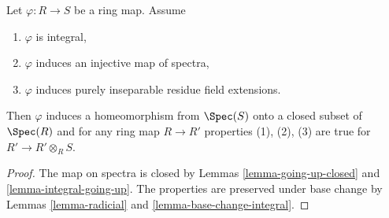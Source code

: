 \begin{lemma}
\label{lemma-radicial-integral}
Let $\varphi : R \to S$ be a ring map. Assume
\begin{enumerate}
\item $\varphi$ is integral,
\item $\varphi$ induces an injective map of spectra,
\item $\varphi$ induces purely inseparable residue field extensions.
\end{enumerate}
Then $\varphi$ induces a homeomorphism from $\Spec(S)$ onto a closed
subset of $\Spec(R)$ and for any ring map
$R \to R'$ properties (1), (2), (3) are true for $R' \to R' \otimes_R S$.
\end{lemma}

\begin{proof}
The map on spectra is closed by
Lemmas \ref{lemma-going-up-closed} and \ref{lemma-integral-going-up}.
The properties are preserved under base change by
Lemmas \ref{lemma-radicial} and \ref{lemma-base-change-integral}.
\end{proof}